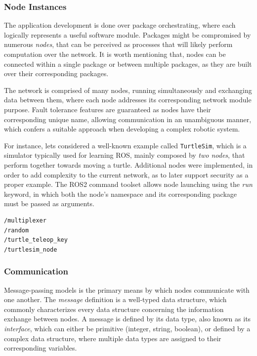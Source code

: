 \subsubsection{Node Instances}

The application development is done over package orchestrating, where each logically represents a useful software module. Packages might be compromised by numerous \textit{nodes}, that can be perceived as processes that will likely perform computation over the network. It is worth mentioning that, nodes can be connected within a single package or between multiple packages, as they are built over their corresponding packages.

The network is comprised of many nodes, running simultaneously and exchanging data between them, where each node addresses its corresponding network module purpose. Fault tolerance features are guaranteed as nodes have their corresponding unique name, allowing communication in an unambiguous manner, which confers a suitable approach when developing a complex robotic system.

For instance, lets considered a well-known example called \texttt{TurtleSim}, which is a simulator typically used for learning ROS, mainly composed by \textit{two nodes}, that perform together towards moving a turtle. Additional nodes were implemented, in order to add complexity to the current network, as to later support security as a proper example. The ROS2 command toolset allows node launching using the \textit{run} keyword, in which both the node's namespace and its corresponding package must be passed as arguments.

\begin{lstlisting}[title={The \texttt{TurtleSim} node list.}]
/multiplexer
/random
/turtle_teleop_key
/turtlesim_node
\end{lstlisting}

\subsubsection{Communication}

Message-passing models is the primary means by which nodes communicate with one another. The \textit{message} definition is a well-typed data structure, which commonly characterizes every data structure concerning the information exchange between nodes. A message is defined by its data type, also known as its \textit{interface}, which can either be primitive (integer, string, boolean), or defined by a complex data structure, where multiple data types are assigned to their corresponding variables. 

